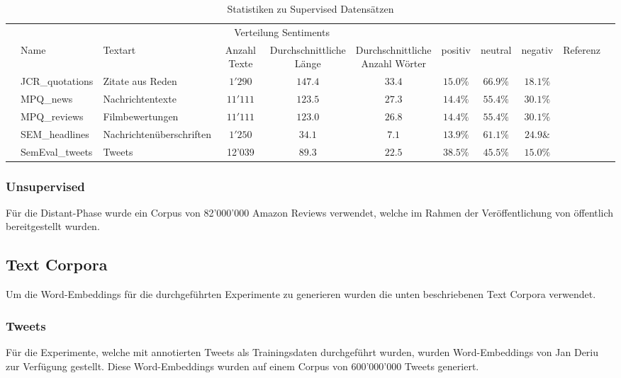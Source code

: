 \begin{table*}\centering
	\begin{adjustbox}{max width=\textwidth}
		\begin{tabular}{@{}lllcccccccl@{}}
			\toprule
			\multicolumn{9}{c}{Verteilung Sentiments}\\
			\cmidrule(r){7-9}
			& Name & Textart & Anzahl Texte & \specialcell{Durchschnittliche\\Länge} & \specialcell{Durchschnittliche\\Anzahl Wörter} & positiv & neutral & negativ & Referenz &\\ \midrule
			& JCR{\_}quotations & Zitate aus Reden & $1'290$ & $147.4$ & $33.4$ & $15.0\%$ & $66.9\%$ & $18.1\%$ & \cite{cieliebak2013potential}\\
			& MPQ{\_}news & Nachrichtentexte & $11'111$ & $123.5$ & $27.3$ & $14.4\%$ & $55.4\%$ & $30.1\%$ & \cite{cieliebak2013potential}\\
			& MPQ{\_}reviews & Filmbewertungen & $11'111$ & $123.0$ & $26.8$  & $14.4\%$ & $55.4\%$ & $30.1\%$ & \cite{cieliebak2013potential}\\
			& SEM{\_}headlines & Nachrichtenüberschriften & $1'250$ & $34.1$ & $7.1$ & $13.9\%$ & $61.1\%$ & $24.9\&$ & \cite{cieliebak2013potential}\\
			& SemEval{\_}tweets & Tweets & 12'039 & $89.3$ & $22.5$ & $38.5\%$ & $45.5\%$ & $15.0\%$ & \cite{SemEval:2016:task4}\\
			\bottomrule
		\end{tabular}
	\end{adjustbox}
	\caption{Statistiken zu Supervised Datensätzen}
\end{table*}

\subsubsection{Unsupervised}
Für die Distant-Phase wurde ein Corpus von 82'000'000 Amazon Reviews verwendet, welche im Rahmen der Veröffentlichung von \cite{zhang2015character} öffentlich bereitgestellt wurden.

\subsection{Text Corpora}
Um die Word-Embeddings für die durchgeführten Experimente zu generieren wurden die unten beschriebenen Text Corpora verwendet.

\subsubsection{Tweets}
Für die Experimente, welche mit annotierten Tweets als Trainingsdaten durchgeführt wurden, wurden Word-Embeddings von Jan Deriu zur Verfügung gestellt. Diese Word-Embeddings wurden auf einem Corpus von 600'000'000 Tweets generiert.

